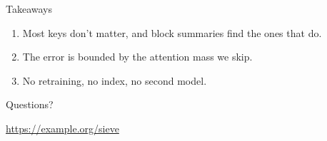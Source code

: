 \documentclass[aspectratio=169]{beamer}
\begin{document}
\begin{frame}{Takeaways}
  \begin{enumerate}
    \item Most keys don't matter, and block summaries find the ones that do.
    \item The error is bounded by the attention mass we skip.
    \item No retraining, no index, no second model.
  \end{enumerate}
\end{frame}

\begin{frame}[standout]
  Questions?

  \vspace{1em}
  \small\url{https://example.org/sieve}
\end{frame}
\end{document}
